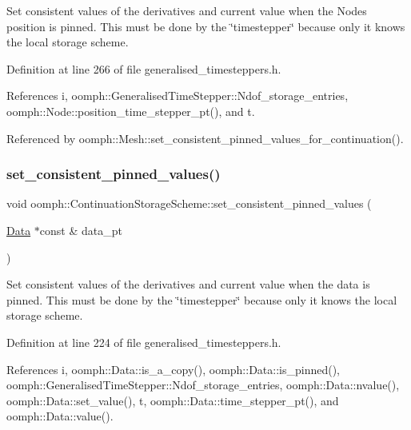 Set consistent values of the derivatives and current value when the Nodes position is pinned. This must be done by the \char`\"{}timestepper\char`\"{} because only it knows the local storage scheme. 



Definition at line 266 of file generalised\+\_\+timesteppers.\+h.



References i, oomph\+::\+Generalised\+Time\+Stepper\+::\+Ndof\+\_\+storage\+\_\+entries, oomph\+::\+Node\+::position\+\_\+time\+\_\+stepper\+\_\+pt(), and t.



Referenced by oomph\+::\+Mesh\+::set\+\_\+consistent\+\_\+pinned\+\_\+values\+\_\+for\+\_\+continuation().

\mbox{\label{classoomph_1_1ContinuationStorageScheme_a279e4c16176c0374b9bba05519a17b0c}} 
\subsubsection{\texorpdfstring{set\+\_\+consistent\+\_\+pinned\+\_\+values()}{set\_consistent\_pinned\_values()}}
{\footnotesize\ttfamily void oomph\+::\+Continuation\+Storage\+Scheme\+::set\+\_\+consistent\+\_\+pinned\+\_\+values (\begin{DoxyParamCaption}\item[{\hyperlink{classoomph_1_1Data}{Data} $\ast$const \&}]{data\+\_\+pt }\end{DoxyParamCaption})\hspace{0.3cm}{\ttfamily [inline]}}



Set consistent values of the derivatives and current value when the data is pinned. This must be done by the \char`\"{}timestepper\char`\"{} because only it knows the local storage scheme. 



Definition at line 224 of file generalised\+\_\+timesteppers.\+h.



References i, oomph\+::\+Data\+::is\+\_\+a\+\_\+copy(), oomph\+::\+Data\+::is\+\_\+pinned(), oomph\+::\+Generalised\+Time\+Stepper\+::\+Ndof\+\_\+storage\+\_\+entries, oomph\+::\+Data\+::nvalue(), oomph\+::\+Data\+::set\+\_\+value(), t, oomph\+::\+Data\+::time\+\_\+stepper\+\_\+pt(), and oomph\+::\+Data\+::value().



